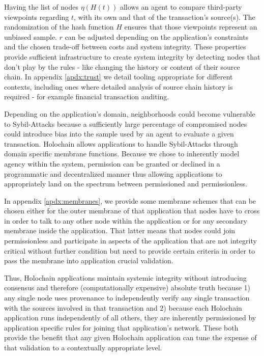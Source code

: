 \documentclass[twocolumn,showpacs,%
  nofootinbib,aps,superscriptaddress,%
  eqsecnum,prd,notitlepage,showkeys,10pt]{revtex4-1}
\begin{document}
Having the list of nodes $\eta(H(t))$ allows an agent to compare third-party viewpoints regarding $t$, with its own and that of the transaction's source(s).
The randomization of the hash function $H$ ensures that those viewpoints represent
an unbiased sample.
$r$ can be adjusted depending on the application's constraints and the chosen trade-off between costs and system integrity.
These properties provide sufficient infrastructure to create system integrity 
by detecting nodes that don't play by the rules - like changing the history or
content of their source chain.
In appendix \ref{apdx:trust} we detail tooling appropriate for different contexts,
including ones where detailed analysis of source chain history is required -
for example financial transaction auditing.

Depending on the application's domain, neighborhoods could become vulnerable to Sybil-Attacks because a sufficiently large percentage of compromised nodes could introduce bias into the sample used by an agent to evaluate a given transaction.
Holochain allows applications to handle Sybil-Attacks through domain specific
membrane functions.
Because we chose to inherently model agency within the system,
permission can be granted or declined in a programmatic and decentralized manner
thus allowing applications to appropriately land on the spectrum between permissioned and permissionless.

In appendix \ref{apdx:membranes}, we provide some membrane schemes that can be
chosen either for the outer
membrane of that application that nodes have to cross in order to talk to
any other node within the application or for any secondary membrane inside
the application.
That latter means that nodes could join permissionless and participate in aspects
of the application that are not integrity critical without further condition
but need to provide certain criteria in order to pass the membrane into application crucial
validation.

Thus, Holochain applications maintain systemic integrity without introducing
consensus and therefore (computationally expensive) absolute truth because 1) any single node uses provenance to independently verify any single transaction with the sources involved in that transaction and 2) because each Holochain application runs independently of all others, they are inherently permissioned by application specific rules for joining that application's network.
These both provide the benefit that any given Holochain application can tune the expense of that validation to a contextually appropriate level.
\end{document}
